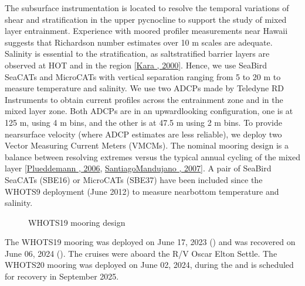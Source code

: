 \documentclass[a4paper,10pt,english,openany,oneside]{sphinxmanual}
\let\sphinxpxdimen\pdfpxdimen\else\newdimen\sphinxpxdimen
\begin{document}
\sphinxAtStartPar
The subsurface instrumentation is located to resolve the temporal variations of
shear and stratification in the upper pycnocline to support the study of mixed
layer entrainment. Experience with moored profiler measurements near Hawaii
suggests that Richardson number estimates over 10 m scales are adequate.
Salinity is essential to the stratification, as salt\sphinxhyphen{}stratified barrier layers
are observed at HOT and in the region {[}\hyperlink{cite.references:id11}{Kara , 2000}{]}. Hence, we use Sea\sphinxhyphen{}Bird
SeaCATs and MicroCATs with vertical separation ranging from 5 to 20 m to
measure temperature and salinity. We use two ADCPs made by Teledyne RD
Instruments to obtain current profiles across the entrainment zone and in the
mixed layer zone. Both ADCPs are in an upward\sphinxhyphen{}looking configuration, one is at
125 m, using 4 m bins, and the other is at 47.5 m using 2 m bins. To provide
near\sphinxhyphen{}surface velocity (where ADCP estimates are less reliable), we deploy two
Vector Measuring Current Meters (VMCMs). The nominal mooring design is a
balance between resolving extremes versus the typical annual cycling of the
mixed layer {[}\hyperlink{cite.references:id14}{Plueddemann , 2006}, \hyperlink{cite.references:id15}{Santiago\sphinxhyphen{}Mandujano , 2007}{]}. A pair of Sea\sphinxhyphen{}Bird
SeaCATs (SBE\sphinxhyphen{}16) or MicroCATs (SBE\sphinxhyphen{}37) have been included since the WHOTS\sphinxhyphen{}9
deployment (June 2012) to measure near\sphinxhyphen{}bottom temperature and salinity.

\begin{figure}[htbp]
\centering
\capstart

\noindent\sphinxincludegraphics[height=1000\sphinxpxdimen]{{whots19-diagram}.png}
\caption{WHOTS\sphinxhyphen{}19 mooring design}\label{\detokenize{1_section:diagram}}\end{figure}

\sphinxAtStartPar
The WHOTS\sphinxhyphen{}19 mooring was deployed on June 17, 2023
()
and was recovered on June 06, 2024
().
The cruises were aboard the R/V Oscar Elton Settle. The WHOTS\sphinxhyphen{}20 mooring was
deployed on June 02, 2024, during the
and is scheduled for recovery in September 2025.
\end{document}
